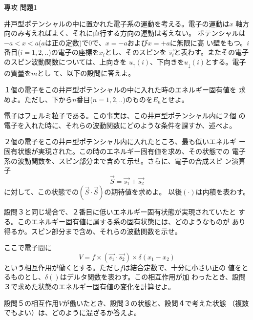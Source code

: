 \documentclass[fleqn]{jbook}
\begin{document}
\begin{question}{専攻 問題1}{}

井戸型ポテンシャルの中に置かれた電子系の運動を考える。電子の運動は$x$
軸方向のみ考えればよく、それに直行する方向の運動は考えない。
ポテンシャルは$-a<x<a$($a$は正の定数)で$0$で、$x=-a$および$x=+a$に無限に高
い壁をもつ。$i$番目($i=1,2,..$)の電子の座標を$x_i$とし、そのスピンを
$\vec{s_i}$と表わす。またその電子のスピン波動関数については、上向きを
$u_\uparrow(i)$、下向きを$u_\downarrow(i)$とする。電子の質量を$m$とし
て、以下の設問に答えよ。

\begin{subquestions}
\SubQuestion
  １個の電子をこの井戸型ポテンシャルの中に入れた時のエネルギー固有値を
  求めよ。ただし、下から$n$番目($n=1,2,..$)のものを$E_n$とせよ。

\SubQuestion
  電子はフェルミ粒子である。この事実は、この井戸型ポテンシャル内に２個
  の電子を入れた時に、それらの波動関数にどのような条件を課すか、述べよ。

\SubQuestion
  ２個の電子をこの井戸型ポテンシャル内に入れたところ、最も低いエネルギ
  ー固有状態が実現された。この時のエネルギー固有値を求め、その状態での
  電子系の波動関数を、スピン部分まで含めて示せ。さらに、電子の合成スピ
  ン演算子
  \[
    \vec{S}=\vec{s_1}+\vec{s_2}
  \] 
  に対して、この状態での$(\vec{S} \cdot \vec{S})$の期待値を求めよ。
  以後$(\cdot)$は内積を表わす。

\SubQuestion
  設問３と同じ場合で、２番目に低いエネルギー固有状態が実現されていたと
  する。このエネルギー固有値に属する系の固有状態には、どのようなものが
  あり得るか。スピン部分まで含め、それらの波動関数を示せ。

\SubQuestion
  ここで電子間に
  \[
    V = f \times (\vec{s_1} \cdot \vec{s_2}) \times \delta(x_{1}-x_{2})
  \]
  という相互作用が働くとする。ただし$f$は結合定数で、十分に小さい正の
  値をとるものとし、$\delta()$はデルタ関数を表わす。この相互作用が加
  わったとき、設問３で求めた状態のエネルギー固有値の変化を計算せよ。

\SubQuestion
  設問５の相互作用$V$が働いたとき、設問３の状態と、設問４で考えた状態
  （複数でもよい）は、どのように混ざるか答えよ。

\end{subquestions}

\end{question}
\end{document}
